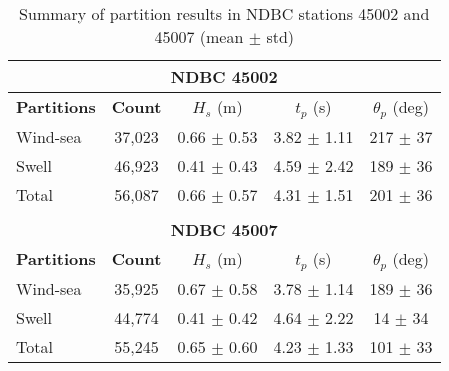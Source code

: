 \begin{table}[htbp]
\centering
\caption{Summary of partition results in NDBC stations 45002 and 45007 (mean $\pm$ std)}
\label{tab:tab4.1}
\begin{tabular}{|l|c|c|c|c|}
\hline
\multicolumn{5}{|c|}{\textbf{NDBC 45002}} \\ \hline
\textbf{Partitions} & \textbf{Count} & $H_s$ (m) & $t_p$ (s) & $\theta_p$ (deg) \\ \hline
Wind-sea & 37,023 & 0.66 $\pm$ 0.53 & 3.82 $\pm$ 1.11 & 217 $\pm$ 37 \\ \hline
Swell    & 46,923 & 0.41 $\pm$ 0.43 & 4.59 $\pm$ 2.42 & 189 $\pm$ 36 \\ \hline
Total    & 56,087 & 0.66 $\pm$ 0.57 & 4.31 $\pm$ 1.51 & 201 $\pm$ 36 \\ \hline
\multicolumn{5}{c}{} \\[-6pt] \hline
\multicolumn{5}{|c|}{\textbf{NDBC 45007}} \\ \hline
\textbf{Partitions} & \textbf{Count} & $H_s$ (m) & $t_p$ (s) & $\theta_p$ (deg) \\ \hline
Wind-sea & 35,925 & 0.67 $\pm$ 0.58 & 3.78 $\pm$ 1.14 & 189 $\pm$ 36 \\ \hline
Swell    & 44,774 & 0.41 $\pm$ 0.42 & 4.64 $\pm$ 2.22 & 14 $\pm$ 34  \\ \hline
Total    & 55,245 & 0.65 $\pm$ 0.60 & 4.23 $\pm$ 1.33 & 101 $\pm$ 33 \\ \hline
\end{tabular}
\end{table}
